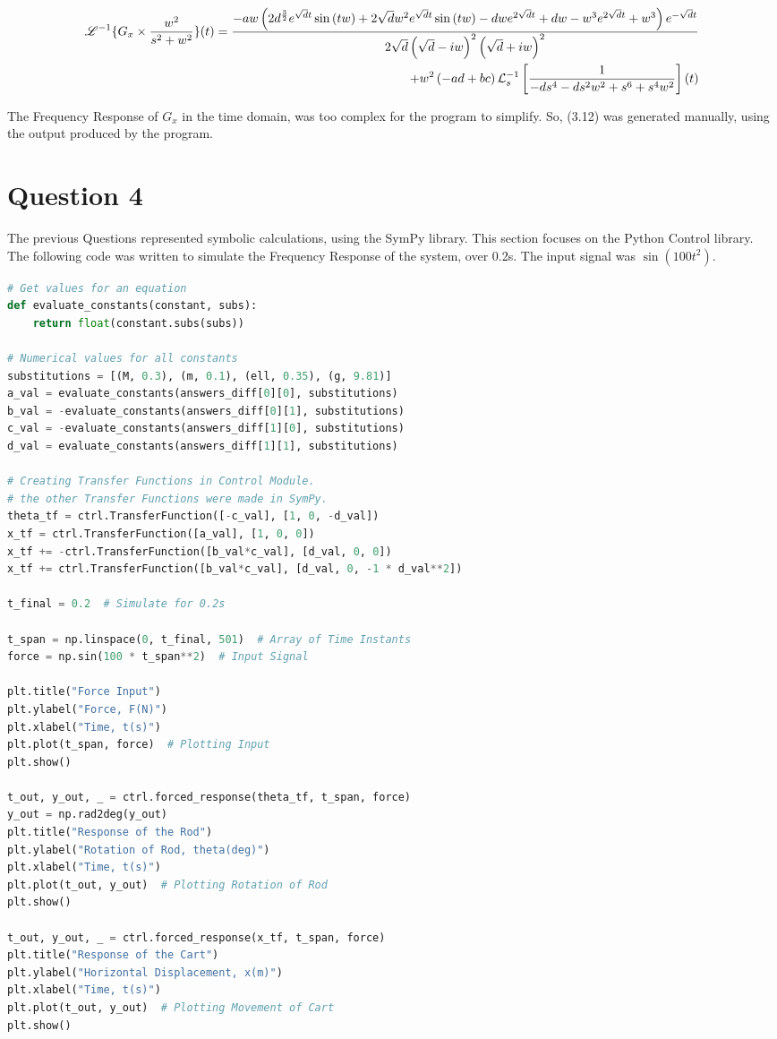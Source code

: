 \documentclass[a4paper,10pt,reqno]{article}
\newcommand{\lap}{\mathscr{L}}
\numberwithin{equation}{section}
\begin{document}
\begin{align}
\lap^{-1} \{G_x\times\frac{w^{2}}{s^{2} + w^{2}}\} (t) =  
\frac{ - aw \left(2 d^{\frac{3}{2}} e^{\sqrt{d} t} \sin{\left(t w \right)} + 2 \sqrt{d} w^{2} e^{\sqrt{d} t} \sin{\left(t w \right)} - d w e^{2 \sqrt{d} t} + d w - w^{3} e^{2 \sqrt{d} t} + w^{3}\right) e^{- \sqrt{d} t} }
{2 \sqrt{d} \left(\sqrt{d} - i w\right)^{2} \left(\sqrt{d} + i w\right)^{2}}\cr
+ w^2 \left(- a d + b c\right) \mathcal{L}^{-1}_{s}\left[\frac{1}{- d s^{4} - d s^{2} w^{2} + s^{6} + s^{4} w^{2}}\right]\left(t\right)
\end{align}

The Frequency Response of $G_x$ in the time domain, was too complex for the program to simplify. So, (3.12) was generated manually, using the output produced by the program.

\newpage
\section{Question 4}
The previous Questions represented symbolic calculations, using the SymPy library. This section focuses on the Python Control library.\\
The following code was written to simulate the Frequency Response of the system, over 0.2s. The input signal was 
$\sin(100t^2)$.
\begin{lstlisting}[language=Python]
# Get values for an equation
def evaluate_constants(constant, subs):
    return float(constant.subs(subs))

# Numerical values for all constants
substitutions = [(M, 0.3), (m, 0.1), (ell, 0.35), (g, 9.81)]
a_val = evaluate_constants(answers_diff[0][0], substitutions)
b_val = -evaluate_constants(answers_diff[0][1], substitutions)
c_val = -evaluate_constants(answers_diff[1][0], substitutions)
d_val = evaluate_constants(answers_diff[1][1], substitutions)

# Creating Transfer Functions in Control Module.
# the other Transfer Functions were made in SymPy. 
theta_tf = ctrl.TransferFunction([-c_val], [1, 0, -d_val])
x_tf = ctrl.TransferFunction([a_val], [1, 0, 0])
x_tf += -ctrl.TransferFunction([b_val*c_val], [d_val, 0, 0])
x_tf += ctrl.TransferFunction([b_val*c_val], [d_val, 0, -1 * d_val**2])

t_final = 0.2  # Simulate for 0.2s

t_span = np.linspace(0, t_final, 501)  # Array of Time Instants
force = np.sin(100 * t_span**2)  # Input Signal

plt.title("Force Input")
plt.ylabel("Force, F(N)")
plt.xlabel("Time, t(s)")
plt.plot(t_span, force)  # Plotting Input
plt.show()

t_out, y_out, _ = ctrl.forced_response(theta_tf, t_span, force)
y_out = np.rad2deg(y_out)
plt.title("Response of the Rod")
plt.ylabel("Rotation of Rod, theta(deg)")
plt.xlabel("Time, t(s)")
plt.plot(t_out, y_out)  # Plotting Rotation of Rod
plt.show()

t_out, y_out, _ = ctrl.forced_response(x_tf, t_span, force)
plt.title("Response of the Cart")
plt.ylabel("Horizontal Displacement, x(m)")
plt.xlabel("Time, t(s)")
plt.plot(t_out, y_out)  # Plotting Movement of Cart
plt.show()
\end{lstlisting}
\end{document}
